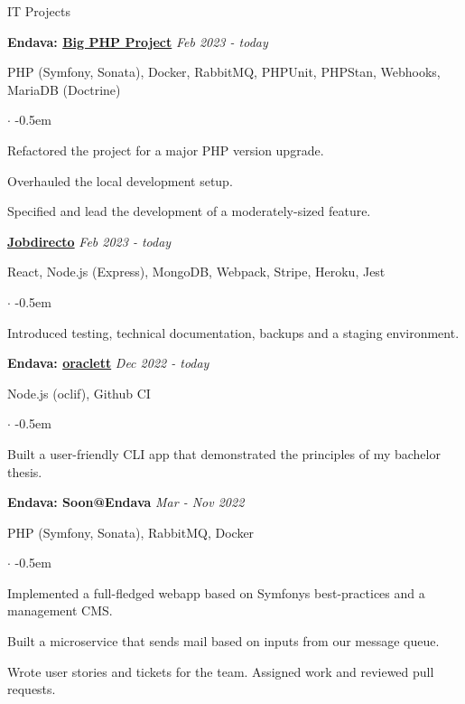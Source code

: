 \documentclass{cv}
\begin{document}
\begin{rSection}{IT Projects}



  \textbf{Endava: \href{https://tvthek.orf.at/}{Big PHP Project}}
  \hfill
  {\em Feb 2023 - today}

  PHP (Symfony, Sonata), Docker, RabbitMQ, PHPUnit, PHPStan, Webhooks, MariaDB (Doctrine)
  \begin{list}{$\cdot$}{}
  \itemsep -0.5em \vspace{-0.5em}
    \smallskip
  \item Refactored the project for a major PHP version upgrade.
  \item Overhauled the local development setup.
  \item Specified and lead the development of a moderately-sized feature.
  \end{list}

  \textbf{\href{https://www.jobdirecto.com/}{Jobdirecto}}
  \hfill
  {\em Feb 2023 - today}

  React, Node.js (Express), MongoDB, Webpack, Stripe, Heroku, Jest
  \begin{list}{$\cdot$}{}
  \itemsep -0.5em \vspace{-0.5em}
    \smallskip
  \item Introduced testing, technical documentation, backups and a staging environment.
  \end{list}


  \textbf{Endava: \href{https://github.com/jneidel/oraclett}{oraclett}}
  \hfill
  {\em Dec 2022 - today}

  Node.js (oclif), Github CI
  \begin{list}{$\cdot$}{}
  \itemsep -0.5em \vspace{-0.5em}
    \smallskip
  \item Built a user-friendly CLI app that demonstrated the principles of my bachelor thesis.
  \end{list}

  \textbf{Endava: Soon@Endava}
  \hfill
  {\em Mar - Nov 2022}

  PHP (Symfony, Sonata), RabbitMQ, Docker
  \begin{list}{$\cdot$}{}
  \itemsep -0.5em \vspace{-0.5em}
    \smallskip
  \item Implemented a full-fledged webapp based on Symfonys best-practices and a management CMS.
  \item Built a microservice that sends mail based on inputs from our message queue.
  \item Wrote user stories and tickets for the team. Assigned work and reviewed pull requests.
  \end{list}


\end{rSection}
\end{document}
